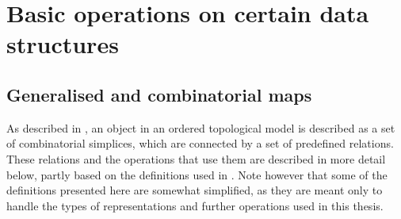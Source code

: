 \section{Basic operations on certain data structures}
\label{se:operations}

\subsection{Generalised and combinatorial maps}
\label{ss:operations-maps}

As described in , an object in an ordered topological model is described as a set of combinatorial simplices, which are connected by a set of predefined relations.
These relations and the operations that use them are described in more detail below, partly based on the definitions used in \citet{Damiand14}.
Note however that some of the definitions presented here are somewhat simplified, as they are meant only to handle the types of representations and further operations used in this thesis.

